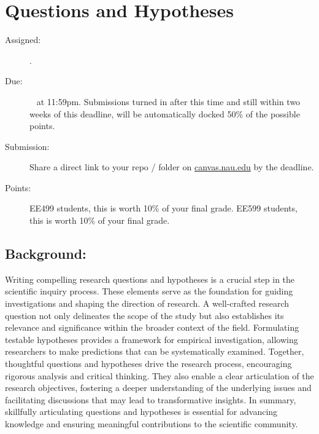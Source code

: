 \documentclass[11pt]{article}
\begin{document}
\section{Questions and Hypotheses}
\begin{description}
	\item [Assigned:] \wkSevenTu. %
	\item [Due:] \wkEightTu~ at 11:59pm. Submissions turned in after this time and still within two weeks of this deadline, will be automatically docked 50\% of the possible points. %
	\item [Submission:] Share a direct link to your repo / folder on \href{https://canvas.nau.edu}{canvas.nau.edu} by the deadline.
	\item [Points:] EE499 students, this is worth 10\% of your final grade.  EE599 students, this is worth 10\% of your final grade.
\end{description}

\subsection*{Background:}
Writing compelling research questions and hypotheses is a crucial step in the scientific inquiry process. These elements serve as the foundation for guiding investigations and shaping the direction of research. A well-crafted research question not only delineates the scope of the study but also establishes its relevance and significance within the broader context of the field. Formulating testable hypotheses provides a framework for empirical investigation, allowing researchers to make predictions that can be systematically examined. Together, thoughtful questions and hypotheses drive the research process, encouraging rigorous analysis and critical thinking. They also enable a clear articulation of the research objectives, fostering a deeper understanding of the underlying issues and facilitating discussions that may lead to transformative insights. In summary, skillfully articulating questions and hypotheses is essential for advancing knowledge and ensuring meaningful contributions to the scientific community.
\end{document}
